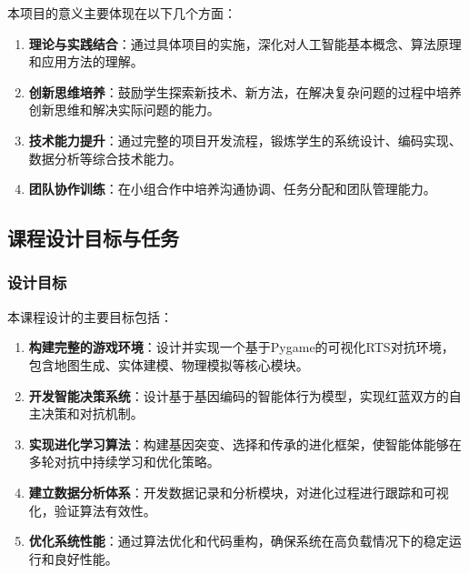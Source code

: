 \documentclass[12pt,a4paper]{article}
\begin{document}
	本项目的意义主要体现在以下几个方面：
	\begin{enumerate}
		\item \textbf{理论与实践结合}：通过具体项目的实施，深化对人工智能基本概念、算法原理和应用方法的理解。
		\item \textbf{创新思维培养}：鼓励学生探索新技术、新方法，在解决复杂问题的过程中培养创新思维和解决实际问题的能力。
		\item \textbf{技术能力提升}：通过完整的项目开发流程，锻炼学生的系统设计、编码实现、数据分析等综合技术能力。
		\item \textbf{团队协作训练}：在小组合作中培养沟通协调、任务分配和团队管理能力。
	\end{enumerate}
	
	\subsection{课程设计目标与任务}
	\subsubsection{设计目标}
	本课程设计的主要目标包括：
	\begin{enumerate}
		\item \textbf{构建完整的游戏环境}：设计并实现一个基于Pygame的可视化RTS对抗环境，包含地图生成、实体建模、物理模拟等核心模块。
		\item \textbf{开发智能决策系统}：设计基于基因编码的智能体行为模型，实现红蓝双方的自主决策和对抗机制。
		\item \textbf{实现进化学习算法}：构建基因突变、选择和传承的进化框架，使智能体能够在多轮对抗中持续学习和优化策略。
		\item \textbf{建立数据分析体系}：开发数据记录和分析模块，对进化过程进行跟踪和可视化，验证算法有效性。
		\item \textbf{优化系统性能}：通过算法优化和代码重构，确保系统在高负载情况下的稳定运行和良好性能。
	\end{enumerate}
	
\end{document}
